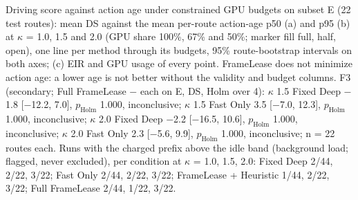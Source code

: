\caption{Driving score against action age under constrained GPU budgets on subset E (22 test routes): mean DS against the mean per-route action-age p50 (a) and p95 (b) at $\kappa$ = 1.0, 1.5 and 2.0 (GPU share 100\%, 67\% and 50\%; marker fill full, half, open), one line per method through its budgets, 95\% route-bootstrap intervals on both axes; (c) EIR and GPU usage of every point. FrameLease does not minimize action age: a lower age is not better without the validity and budget columns. F3 (secondary; Full FrameLease $-$ each on E, DS, Holm over 4): $\kappa$ 1.5 Fixed Deep $-$1.8 [$-$12.2, 7.0], $p_\mathrm{Holm}$ 1.000, inconclusive; $\kappa$ 1.5 Fast Only 3.5 [$-$7.0, 12.3], $p_\mathrm{Holm}$ 1.000, inconclusive; $\kappa$ 2.0 Fixed Deep $-$2.2 [$-$16.5, 10.6], $p_\mathrm{Holm}$ 1.000, inconclusive; $\kappa$ 2.0 Fast Only 2.3 [$-$5.6, 9.9], $p_\mathrm{Holm}$ 1.000, inconclusive; n = 22 routes each. Runs with the charged prefix above the idle band (background load; flagged, never excluded), per condition at $\kappa$ = 1.0, 1.5, 2.0: Fixed Deep 2/44, 2/22, 3/22; Fast Only 2/44, 2/22, 3/22; FrameLease + Heuristic 1/44, 2/22, 3/22; Full FrameLease 2/44, 1/22, 3/22.}%
\label{fig:fig3}%
